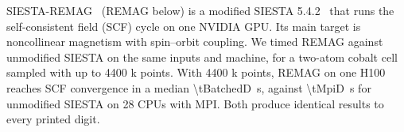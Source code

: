 \noindent
SIESTA-REMAG~\citep{REMAG} (REMAG below) is a modified SIESTA 5.4.2~\citep{Soler2002,Garcia2020} that runs the
self-consistent field (SCF) cycle on one NVIDIA GPU. Its main target is
noncollinear magnetism with spin--orbit coupling. We timed REMAG against
unmodified SIESTA on the same inputs and machine, for a two-atom cobalt cell
sampled with up to \num{4400} k points. With \num{4400} k points, REMAG on one
H100 reaches SCF convergence in a median \SI{\tBatchedD}{s}, against
\SI{\tMpiD}{s} for unmodified SIESTA on 28 CPUs with MPI. Both produce
identical results to every printed digit.
